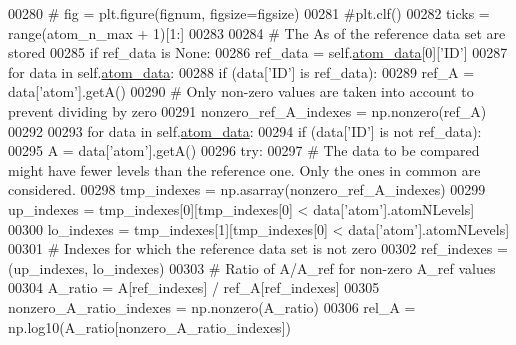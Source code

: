 \begin{DoxyCode}
{{{00280         \textcolor{comment}{#    fig = plt.figure(fignum, figsize=figsize)}
00281         \textcolor{comment}{#plt.clf()}
00282         ticks = range(atom\_n\_max + 1)[1:]
00283 
00284         \textcolor{comment}{# The As of the reference data set are stored}
00285         \textcolor{keywordflow}{if} ref\_data \textcolor{keywordflow}{is} \textcolor{keywordtype}{None}:
00286             ref\_data = self.\hyperlink{classpyneb_1_1plot_1_1plot_atomic_data_1_1_data_plot_aee33ad460a38cb4293a5bd89cec12294}{atom\_data}[0][\textcolor{stringliteral}{'ID'}]
00287         \textcolor{keywordflow}{for} data \textcolor{keywordflow}{in} self.\hyperlink{classpyneb_1_1plot_1_1plot_atomic_data_1_1_data_plot_aee33ad460a38cb4293a5bd89cec12294}{atom\_data}:
00288             \textcolor{keywordflow}{if} (data[\textcolor{stringliteral}{'ID'}] \textcolor{keywordflow}{is} ref\_data):
00289                 ref\_A = data[\textcolor{stringliteral}{'atom'}].getA()
00290                 \textcolor{comment}{# Only non-zero values are taken into account to prevent dividing by zero}
00291                 nonzero\_ref\_A\_indexes = np.nonzero(ref\_A)
00292 
00293         \textcolor{keywordflow}{for} data \textcolor{keywordflow}{in} self.\hyperlink{classpyneb_1_1plot_1_1plot_atomic_data_1_1_data_plot_aee33ad460a38cb4293a5bd89cec12294}{atom\_data}:
00294             \textcolor{keywordflow}{if} (data[\textcolor{stringliteral}{'ID'}] \textcolor{keywordflow}{is} \textcolor{keywordflow}{not} ref\_data):
00295                 A = data[\textcolor{stringliteral}{'atom'}].getA()
00296                 \textcolor{keywordflow}{try}:
00297                     \textcolor{comment}{# The data to be compared might have fewer levels than the reference one. Only the ones
       in common are considered.}
00298                     tmp\_indexes = np.asarray(nonzero\_ref\_A\_indexes) 
00299                     up\_indexes = tmp\_indexes[0][tmp\_indexes[0] < data[\textcolor{stringliteral}{'atom'}].atomNLevels]
00300                     lo\_indexes = tmp\_indexes[1][tmp\_indexes[0] < data[\textcolor{stringliteral}{'atom'}].atomNLevels]
00301                     \textcolor{comment}{# Indexes for which the reference data set is not zero}
00302                     ref\_indexes = (up\_indexes, lo\_indexes)
00303                     \textcolor{comment}{# Ratio of A/A\_ref for non-zero A\_ref values}
00304                     A\_ratio = A[ref\_indexes] / ref\_A[ref\_indexes]
00305                     nonzero\_A\_ratio\_indexes = np.nonzero(A\_ratio)
00306                     rel\_A = np.log10(A\_ratio[nonzero\_A\_ratio\_indexes])
}}}
\end{DoxyCode}
